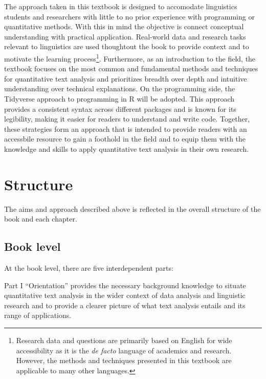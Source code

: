 \documentclass[
  letterpaper,
]{latex/krantz}
\begin{document}
The approach taken in this textbook is designed to accomodate
linguistics students and researchers with little to no prior experience
with programming or quantitative methods. With this in mind the
objective is connect conceptual understanding with practical
application. Real-world data and research tasks relevant to linguistics
are used thoughtout the book to provide context and to motivate the
learning process\footnote{Research data and questions are primarily
  based on English for wide accessibility as it is the \emph{de facto}
  language of academics and research. However, the methods and
  techniques presented in this textbook are applicable to many other
  languages.}. Furthermore, as an introduction to the field, the
textbook focuses on the most common and fundamental methods and
techniques for quantitative text analysis and prioritizes breadth over
depth and intuitive understanding over technical explanations. On the
programming side, the Tidyverse approach to programming in R will be
adopted. This approach provides a consistent syntax across different
packages and is known for its legibility, making it easier for readers
to understand and write code. Together, these strategies form an
approach that is intended to provide readers with an accessbile resource
to gain a foothold in the field and to equip them with the knowledge and
skills to apply quantitative text analysis in their own research.

\hypertarget{structure}{%
\section*{Structure}\label{structure}}


The aims and approach described above is reflected in the overall
structure of the book and each chapter.

\hypertarget{book-level}{%
\subsection*{Book level}\label{book-level}}

At the book level, there are five interdependent parts:

Part I ``Orientation'' provides the necessary background knowledge to
situate quantitative text analysis in the wider context of data analysis
and linguistic research and to provide a clearer picture of what text
analysis entails and its range of applications.
\end{document}
